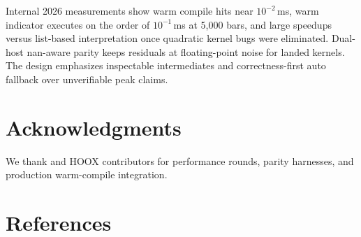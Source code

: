 \documentclass[11pt,a4paper]{article}
\begin{document}
Internal 2026 measurements show warm compile hits near $10^{-2}$\,ms, warm
indicator executes on the order of $10^{-1}$\,ms at 5{,}000 bars, and large
speedups versus list-based interpretation once quadratic kernel bugs were
eliminated. Dual-host nan-aware parity keeps residuals at floating-point
noise for landed kernels. The design emphasizes inspectable intermediates and
correctness-first auto fallback over unverifiable peak claims.

\section*{Acknowledgments}

We thank \pyne{} and HOOX contributors for performance rounds, parity
harnesses, and production warm-compile integration. \trademarknote{}

\section*{References}



\end{document}

